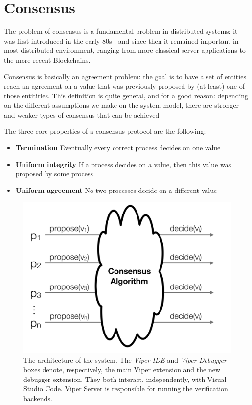 \section{Consensus}\label{sec:Consensus}

The problem of consensus is a fundamental problem in distributed systems: it was first introduced in the early 80s \cite[]{Pease}, \cite[]{Lamport} and since then it remained important in most distributed environment, ranging from more classical server applications to the more recent Blockchains.

Consensus is basically an agreement problem: the goal is to have a set of entities reach an agreement on a value that was previously proposed by (at least) one of those entitities. This definition is quite general, and for a good reason: depending on the different assumptions we make on the system model, there are stronger and weaker types of consensus that can be achieved. 

The three core properties of a consensus protocol are the following:

\begin{itemize}
    \item \textbf{Termination} Eventually every correct process decides on one value
    \item \textbf{Uniform integrity} If a process decides on a value, then this value was proposed by some process
    \item \textbf{Uniform agreement} No two processes decide on a different value
    \end{itemize}

\begin{figure}[htb]
  \centering
  \includegraphics[width=\textwidth,height=\textheight,keepaspectratio]{img/consensus.png}

  \caption[The architecture of the system]{ The architecture of the system. The
    \textit{Viper IDE} and \textit{Viper Debugger} boxes denote, respectively,
    the main Viper extension and the new debugger extension. They both interact,
    independently, with Visual Studio Code. Viper Server is responsible for
    running the verification backends.}
  \label{fig:consensus}
\end{figure}

